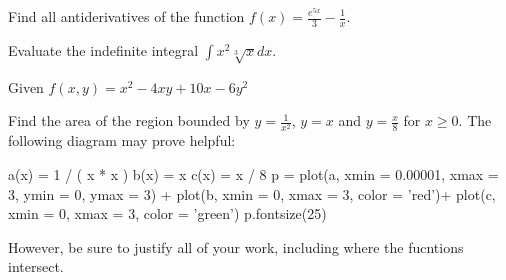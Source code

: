 \documentclass[12pt]{exam}
\begin{document}
\begin{questions}

\question[5]
Find all antiderivatives of the function $f(x) = \displaystyle\frac{e^{5x}}{3}-\frac{1}{x}$.

\vfill

\question[5] 
Evaluate the indefinite integral $\displaystyle \int x^2 \sqrt[3]{x}dx$.

\vfill

\newpage

\noaddpoints \question[10] \addpoints
Given $\displaystyle f(x,y) = x^2-4xy+10x-6y^2$

\newpage

\question[15] Find the area of the region bounded by $y = \frac{1}{x^2}$, $y=x$ and $y = \frac{x}{8}$ for $x\geq 0$. The following diagram may prove helpful:
\begin{sagesilent}
    a(x) =  1 / ( x * x )
    b(x) = x
    c(x) = x / 8
    p = plot(a, xmin = 0.00001, xmax = 3, ymin = 0, ymax = 3) + plot(b, xmin = 0, xmax = 3, color = 'red')+ plot(c, xmin = 0, xmax = 3, color = 'green')
    p.fontsize(25)
\end{sagesilent}

\begin{center}
\end{center}
However, be sure to justify all of your work, including where the fucntions intersect.

\vfill

\end{questions}
\end{document}
